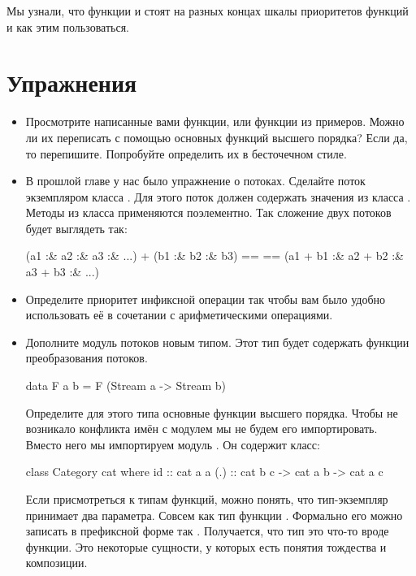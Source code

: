 Мы узнали, что функции \In{($)} и  стоят на разных
концах шкалы приоритетов функций и как этим пользоваться. 

\section{Упражнения}

\begin{itemize}

\item Просмотрите написанные вами функции, или функции
        из примеров. Можно ли их переписать с помощью
        основных функций высшего порядка? 
        Если да, то перепишите. Попробуйте определить
        их в бесточечном стиле.



\item В прошлой главе у нас было упражнение о потоках.
        Сделайте поток экземпляром класса .
        Для этого поток должен содержать значения из класса .
        Методы из класса  применяются поэлементно.
        Так сложение двух потоков будет выглядеть так:

\begin{code}
    (a1 :& a2 :& a3 :& ...) + (b1 :& b2 :& b3) ==
==  (a1 + b1 :& a2 + b2 :& a3 + b3 :& ...)
\end{code}


\item Определите приоритет инфиксной операции \In{(:&)}  
        так чтобы вам было удобно использовать её в сочетании
        с арифметическими операциями.

\item Дополните модуль потоков новым типом. Этот
      тип будет содержать функции преобразования
      потоков.

\begin{code}
data F a b = F (Stream a -> Stream b)
\end{code}

Определите для этого типа основные функции высшего порядка.
Чтобы не возникало конфликта имён с модулем 
мы не будем его импортировать. Вместо него мы импортируем
модуль . Он содержит класс:

\begin{code}
class Category cat where
        id  :: cat a a
        (.) :: cat b c -> cat a b -> cat a c
\end{code}

Если присмотреться к типам функций, можно понять,
что тип-экземпляр  принимает два параметра. 
Совсем как тип функции . Формально его можно записать
в префиксной форме так . Получается,
что тип  это что-то вроде функции. Это некоторые
сущности, у которых есть понятия тождества и композиции.


\end{itemize}
